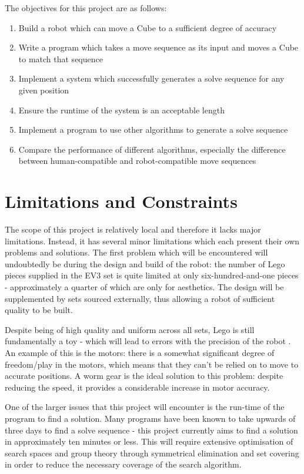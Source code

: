\documentclass{report}
\begin{document}
    The objectives for this project are as follows:
    
    \begin{enumerate}
    	\item Build a robot which can move a Cube to a sufficient degree of accuracy
    	\item Write a program which takes a move sequence as its input and moves a Cube to match that sequence
    	\item Implement a system which successfully  generates a solve sequence for any given position
    	\item Ensure the runtime of the system is an acceptable length
    	\item Implement a program to use other algorithms to generate a solve sequence
    	\item Compare the performance of different algorithms, especially the difference between human-compatible and robot-compatible move sequences
    \end{enumerate}
    
    \section{Limitations and Constraints}
    The scope of this project is relatively local and therefore it lacks major limitations. Instead, it has several minor limitations which each present their own problems and solutions. The first problem which will be encountered will undoubtedly be during the design and build of the robot: the number of Lego pieces supplied in the EV3 set is quite limited at only six-hundred-and-one pieces - approximately a quarter of which are only for aesthetics. The design will  be supplemented by sets sourced externally, thus allowing a robot of sufficient quality to be built.
    
    Despite being of high quality and uniform across all sets, Lego is still fundamentally a toy - which will lead to errors with the precision of the robot \cite{Cook2017}. An example of this is the motors: there is a somewhat significant degree of freedom/play in the motors, which means that they can’t be relied on to move to accurate positions. A worm gear is the ideal solution to this problem: despite reducing the speed, it provides a considerable increase in motor accuracy.
    
    One of the larger issues that this project will encounter is the run-time of the program to find a solution. Many programs have been known to take upwards of three days to find a solve sequence - this project currently aims to find a solution in approximately ten minutes or less. This will require extensive optimisation of search spaces and group theory through symmetrical elimination and set covering in order to reduce the necessary coverage of the search algorithm.
    
\end{document}
